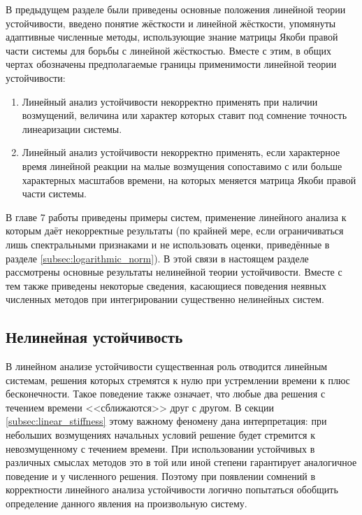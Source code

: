 В предыдущем разделе были приведены основные положения линейной теории устойчивости,
введено понятие жёсткости и линейной жёсткости,
упомянуты адаптивные численные методы, использующие знание матрицы Якоби правой части системы для борьбы с линейной жёсткостью.
Вместе с этим, в общих чертах обозначены предполагаемые границы применимости линейной теории устойчивости:
\begin{enumerate}
    \item
        Линейный анализ устойчивости некорректно применять при наличии возмущений,
        величина или характер которых ставит под сомнение точность линеаризации системы.
    \item
        Линейный анализ устойчивости некорректно применять,
        если характерное время линейной реакции на малые возмущения сопоставимо с или больше характерных масштабов времени,
        на которых меняется матрица Якоби правой части системы.
\end{enumerate}

В главе 7 работы \cite{lambert1991methods} приведены примеры систем,
применение линейного анализа к которым даёт некорректные результаты
(по крайней мере, если ограничиваться лишь спектральными признаками и не использовать оценки, приведённые в разделе \ref{subsec:logarithmic_norm}).
В этой связи в настоящем разделе рассмотрены основные результаты нелинейной теории устойчивости.
Вместе с тем также приведены некоторые сведения,
касающиеся поведения неявных численных методов при интегрировании существенно нелинейных систем.


\subsection{Нелинейная устойчивость}
\label{subsec:nonlinear_stability}

В линейном анализе устойчивости существенная роль отводится линейным системам,
решения которых стремятся к нулю при устремлении времени к плюс бесконечности.
Такое поведение также означает, что любые два решения с течением времени <<сближаются>> друг с другом.
В секции \ref{subsec:linear_stiffness} этому важному феномену дана интерпретация:
при небольших возмущениях начальных условий решение будет стремится к невозмущенному с течением времени.
При использовании устойчивых в различных смыслах методов это в той или иной степени гарантирует аналогичное поведение и у численного решения.
Поэтому при появлении сомнений в корректности линейного анализа устойчивости логично попытаться обобщить определение данного явления на произвольную систему.

